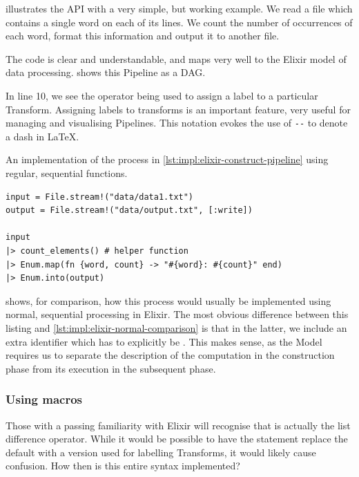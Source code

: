  illustrates the API with a very simple, but working example.
We read a file which contains a single word on each of its lines.
We count the number of occurrences of each word, format this information and output it to another file.

The code is clear and understandable, and maps very well to the Elixir model of data processing.
 shows this Pipeline as a DAG.


In line 10, we see the \exs{--} operator being used to assign a label to a particular Transform.
Assigning labels to transforms is an important feature, very useful for managing and visualising Pipelines.
This notation evokes the use of \verb|--| to denote a dash in \LaTeX.

\begin{listing}[h]
	\caption{An implementation of the process in \cref{lst:impl:elixir-construct-pipeline} using regular, sequential functions.}
	\label{lst:impl:elixir-normal-comparison}
	\begin{verbatim}
input = File.stream!("data/data1.txt")
output = File.stream!("data/output.txt", [:write])

input
|> count_elements() # helper function
|> Enum.map(fn {word, count} -> "#{word}: #{count}" end)
|> Enum.into(output)
	\end{verbatim}
\end{listing}

 shows, for comparison, how this process would usually be implemented using normal, sequential processing in Elixir.
The most obvious difference between this listing and \cref{lst:impl:elixir-normal-comparison} is that in the latter, we include an extra  identifier which has to explicitly be .
This makes sense, as the Model requires us to separate the description of the computation in the construction phase from its execution in the subsequent phase.

\subsubsection{Using macros}

Those with a passing familiarity with Elixir will recognise that \exs{--} is actually the list difference operator.
While it would be possible to have the  statement replace the default \exs{--} with a version used for labelling Transforms, it would likely cause confusion.
How then is this entire syntax implemented?

